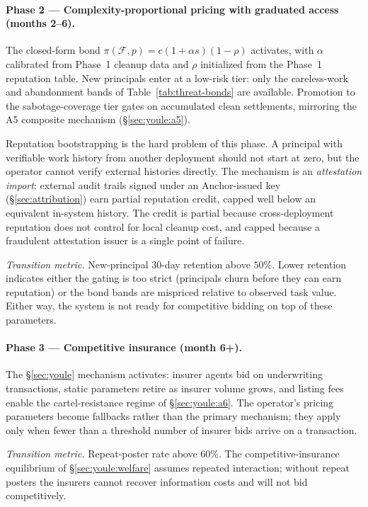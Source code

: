\documentclass[11pt,a4paper]{article}
\theoremstyle{definition}
\theoremstyle{remark}
\begin{document}
\paragraph{Phase 2 --- Complexity-proportional pricing with graduated access (months 2--6).}
The closed-form bond $\pi(\mathcal{F}, p) = c(1 + \alpha s)(1 - \rho)$ activates, with $\alpha$ calibrated from Phase~1 cleanup data and $\rho$ initialized from the Phase~1 reputation table. New principals enter at a low-risk tier: only the careless-work and abandonment bands of Table~\ref{tab:threat-bonds} are available. Promotion to the sabotage-coverage tier gates on accumulated clean settlements, mirroring the A5 composite mechanism (\S\ref{sec:youle:a5}).

Reputation bootstrapping is the hard problem of this phase. A principal with verifiable work history from another deployment should not start at zero, but the operator cannot verify external histories directly. The mechanism is an \emph{attestation import}: external audit trails signed under an Anchor-issued key (\S\ref{sec:attribution}) earn partial reputation credit, capped well below an equivalent in-system history. The credit is partial because cross-deployment reputation does not control for local cleanup cost, and capped because a fraudulent attestation issuer is a single point of failure.

\emph{Transition metric.} New-principal $30$-day retention above $50\%$. Lower retention indicates either the gating is too strict (principals churn before they can earn reputation) or the bond bands are mispriced relative to observed task value. Either way, the system is not ready for competitive bidding on top of these parameters.

\paragraph{Phase 3 --- Competitive insurance (month 6+).}
The \S\ref{sec:youle} mechanism activates: insurer agents bid on underwriting transactions, static parameters retire as insurer volume grows, and listing fees enable the cartel-resistance regime of \S\ref{sec:youle:a6}. The operator's pricing parameters become fallbacks rather than the primary mechanism; they apply only when fewer than a threshold number of insurer bids arrive on a transaction.

\emph{Transition metric.} Repeat-poster rate above $60\%$. The competitive-insurance equilibrium of \S\ref{sec:youle:welfare} assumes repeated interaction; without repeat posters the insurers cannot recover information costs and will not bid competitively.
\end{document}
